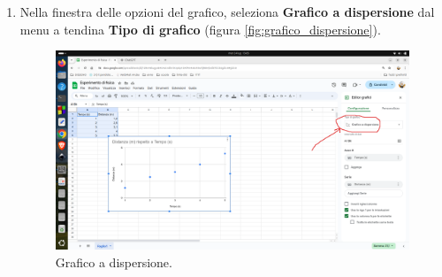 \documentclass[12pt,a4paper,oneside]{book}
\theoremstyle{esercizio}
\begin{document}
\begin{enumerate}
    
    
    \item Nella finestra delle opzioni del grafico, seleziona \textbf{Grafico a dispersione} dal menu a tendina \textbf{Tipo di grafico} (figura \ref{fig:grafico_dispersione}).
    
   \begin{figure}[h!]
    \centering
    \includegraphics[width=\linewidth]{img/dispersione.png} 
    \caption{Grafico a dispersione.}
            \label{fig:dispersione}
\end{figure} 
\end{enumerate}
\end{document}
